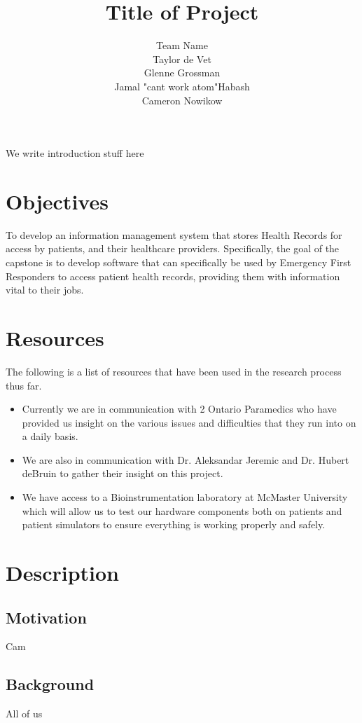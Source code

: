 \documentclass{article}
\title{Title of Project}
\author{Team Name
		\\ Taylor de Vet
    \\ Glenne Grossman
		\\ Jamal "cant work atom"Habash
		\\ Cameron Nowikow
}
\date{}
\begin{document}
\newpage

\maketitle

We write introduction stuff here

\section{Objectives}

To develop an information management system that stores Health Records for access by patients, and their healthcare providers. Specifically, the goal of the capstone is to develop software that can specifically be used by Emergency First Responders to access patient health records,
providing them with information vital to their jobs.

\section{Resources}
The following is a list of resources that have been used in the research process thus far.
\begin{itemize}
\item Currently we are in communication with 2 Ontario Paramedics who have provided us insight on the various issues and difficulties that they run into on a daily basis.
\item We are also in communication with Dr. Aleksandar Jeremic and Dr. Hubert deBruin to gather their insight on this project.
\item We have access to a Bioinstrumentation laboratory at McMaster University which will allow us to test our hardware components both on patients and patient simulators to ensure everything is working properly and safely.
\end{itemize}



\section{Description}

\subsection{Motivation}
Cam
\subsection{Background}
All of us
\end{document}
